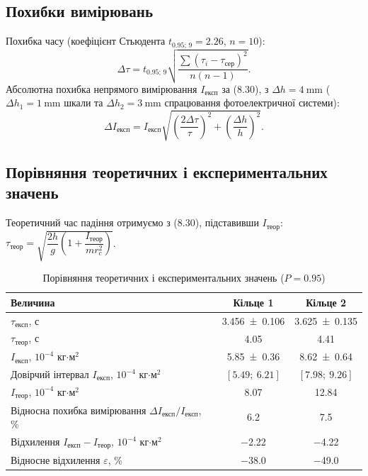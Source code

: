 \documentclass[ukrainian]{ucaphyslab}
\begin{document}
\subsection{Похибки вимірювань}
Похибка часу (коефіцієнт Стьюдента $t_{0.95;\,9}=2.26$, $n=10$):
\begin{equation*}
  \Delta\tau = t_{0.95;\,9}\sqrt{\frac{\sum(\tau_i-\tau_\text{сер})^2}{n(n-1)}}.
\end{equation*}
Абсолютна похибка непрямого вимірювання $I_\text{експ}$ за (8.30), з $\Delta h = \SI{4}{\milli\meter}$
($\Delta h_1 = \SI{1}{\milli\meter}$ шкали та $\Delta h_2 = \SI{3}{\milli\meter}$ спрацювання фотоелектричної системи):
\begin{equation*}
  \Delta I_\text{експ} = I_\text{експ}\sqrt{\left(\frac{2\Delta\tau}{\tau}\right)^2 + \left(\frac{\Delta h}{h}\right)^2}.
\end{equation*}

\subsection{Порівняння теоретичних і експериментальних значень}
Теоретичний час падіння отримуємо з (8.30), підставивши $I_\text{теор}$:
$\tau_\text{теор} = \sqrt{\dfrac{2h}{g}\left(1 + \dfrac{I_\text{теор}}{m r_c^2}\right)}$.

\begin{table}[H]
  \centering
  \begin{tabular}{@{}lcc@{}}
    \toprule
    Величина & Кільце 1 & Кільце 2 \\
    \midrule
    $\tau_\text{експ}$, с & \num{3.456 \pm 0.106} & \num{3.625 \pm 0.135} \\
    $\tau_\text{теор}$, с & \num{4.05} & \num{4.41} \\
    \midrule
    $I_\text{експ}$, $10^{-4}$ кг$\cdot$м$^2$ & \num{5.85 \pm 0.36} & \num{8.62 \pm 0.64} \\
    Довірчий інтервал $I_\text{експ}$, $10^{-4}$ кг$\cdot$м$^2$ & $[5.49;\ 6.21]$ & $[7.98;\ 9.26]$ \\
    $I_\text{теор}$, $10^{-4}$ кг$\cdot$м$^2$ & \num{8.07} & \num{12.84} \\
    \midrule
    Відносна похибка вимірювання $\Delta I_\text{експ}/I_\text{експ}$, \% & \num{6.2} & \num{7.5} \\
    Відхилення $I_\text{експ} - I_\text{теор}$, $10^{-4}$ кг$\cdot$м$^2$ & \num{-2.22} & \num{-4.22} \\
    Відносне відхилення $\varepsilon$, \% & \num{-38.0} & \num{-49.0} \\
    \bottomrule
  \end{tabular}
  \caption{Порівняння теоретичних і експериментальних значень ($P=0.95$)}
\end{table}
\end{document}
